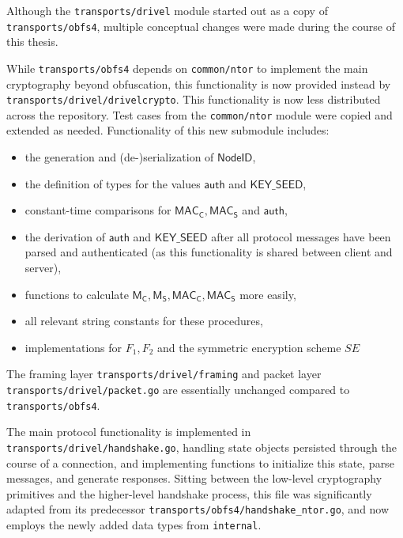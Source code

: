 Although the \texttt{transports/drivel} module started out as a copy of \texttt{transports/obfs4}, multiple conceptual changes were made during the course of this thesis.

While \texttt{transports/obfs4} depends on \texttt{common/ntor} to implement the main cryptography beyond obfuscation, this functionality is now provided instead by \texttt{transports/drivel/drivelcrypto}. This functionality is now less distributed across the repository. Test cases from the \texttt{common/ntor} module were copied and extended as needed.
Functionality of this new submodule includes:
\begin{itemize}
    \item the generation and (de-)serialization of $\mathsf{NodeID}$,
    \item the definition of types for the values $\mathsf{auth}$ and $\mathsf{KEY\_SEED}$,
    \item constant-time comparisons for $\mathsf{MAC_C}, \mathsf{MAC_S}$ and $\mathsf{auth}$,
    \item the derivation of $\mathsf{auth}$ and $\mathsf{KEY\_SEED}$ after all protocol messages have been parsed and authenticated (as this functionality is shared between client and server),
    \item functions to calculate $\mathsf{M_C}, \mathsf{M_S}, \mathsf{MAC_C}, \mathsf{MAC_S}$ more easily,
    \item all relevant string constants for these procedures,
    \item implementations for $F_1, F_2$ and the symmetric encryption scheme $SE$
\end{itemize}

The framing layer \texttt{transports/drivel/framing} and packet layer \texttt{transports/drivel/packet.go} are essentially unchanged compared to \texttt{transports/obfs4}.

The main protocol functionality is implemented in \texttt{transports/drivel/handshake.go}, handling state objects persisted through the course of a connection, and implementing functions to initialize this state, parse messages, and generate responses.
Sitting between the low-level cryptography primitives and the higher-level handshake process, this file was significantly adapted from its predecessor \texttt{transports/obfs4/handshake\_ntor.go}, and now employs the newly added data types from \texttt{internal}.

